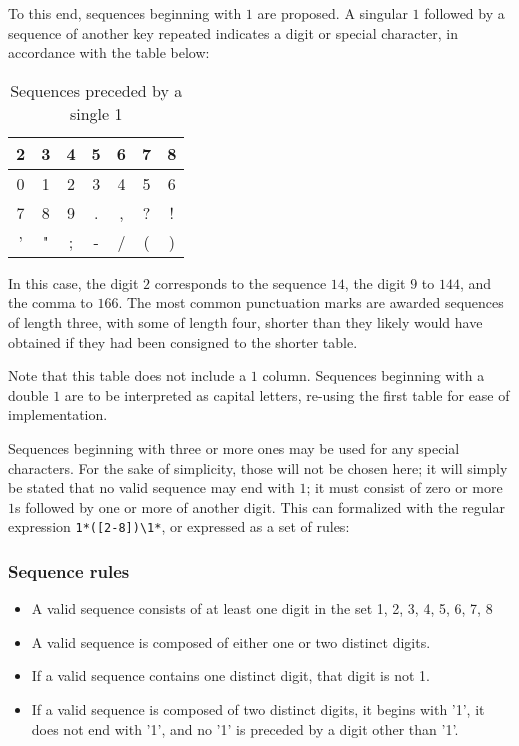 \documentclass{article}
\begin{document}
To this end, sequences beginning with $1$ are proposed.  A singular $1$ followed by a sequence of another key repeated indicates a digit or special character, in accordance with the table below:

\begin{table}
    \centering
    \begin{tabular}{ccccccc}
        2 & 3 & 4 & 5 & 6 & 7 & 8\\
        \hline
        0 & 1 & 2 & 3 & 4 & 5 & 6\\
        7 & 8 & 9 & . & , & ? & !\\
        ' & " & ; & - & / & ( & )\\
    \end{tabular}
    \caption{Sequences preceded by a single 1}
    \label{tab:my_label}
\end{table}

In this case, the digit $2$ corresponds to the sequence $14$, the digit $9$ to $144$, and the comma to $166$.  The most common punctuation marks are awarded sequences of length three, with some of length four, shorter than they likely would have obtained if they had been consigned to the shorter table.

Note that this table does not include a $1$ column.  Sequences beginning with a double $1$ are to be interpreted as capital letters, re-using the first table for ease of implementation.

Sequences beginning with three or more ones may be used for any special characters.  For the sake of simplicity, those will not be chosen here; it will simply be stated that no valid sequence may end with $1$; it must consist of zero or more $1$s followed by one or more of another digit.  This can formalized with the regular expression \verb|1*([2-8])\1*|, or
expressed as a set of rules:

\subsubsection{Sequence rules}
\begin{itemize}
\item A valid sequence consists of at least one digit in the set {1, 2, 3, 4, 5, 6, 7, 8}
\item A valid sequence is composed of either one or two distinct digits.
\item If a valid sequence contains one distinct digit, that digit is not 1.
\item If a valid sequence is composed of two distinct digits, it begins with '1', it does not end with '1', and no '1' is preceded by a digit other than '1'.
\end{itemize}
\end{document}

